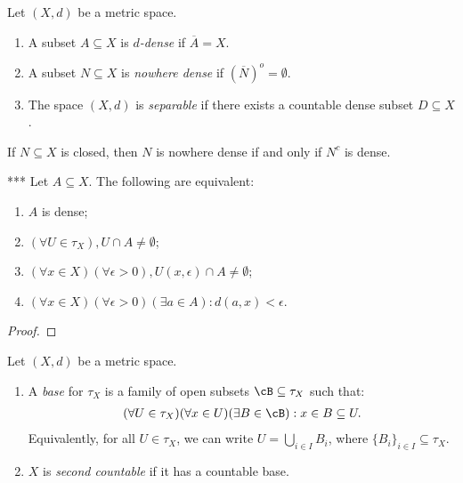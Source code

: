     \begin{definition}
        Let $(X,d)$ be a metric space.
        \begin{enumerate}[label = (\arabic*),itemsep=1pt,topsep=3pt]
            \item A subset $A \subseteq X$ is \textit{$d$-dense} if $\overline{A} = X$.
            \item A subset $N \subseteq X$ is \textit{nowhere dense} if $(\overline{N})^o = \emptyset$.
            \item The space $(X,d)$ is \textit{separable} if there exists a countable dense subset $D \subseteq X$.
        \end{enumerate}
    \end{definition}

    \begin{exercise}
        If $N \subseteq X$ is closed, then $N$ is nowhere dense if and only if $N^c$ is dense.
    \end{exercise}

    \begin{proposition}\label{prop:dense-properties}***
        Let $A \subseteq X$. The following are equivalent:
            \begin{enumerate}[label = (\arabic*),itemsep=1pt,topsep=3pt]
                \item $A$ is dense;
                \item $(\forall U \in \tau_X),U \cap A \neq \emptyset$;
                \item $(\forall x \in X)(\forall \epsilon>0), U(x,\epsilon) \cap A \neq \emptyset$;
                \item $(\forall x \in X)(\forall \epsilon>0)(\exists a \in A):d(a,x) < \epsilon$.
            \end{enumerate}
    \end{proposition}
        \begin{proof}
            
        \end{proof}

    \begin{definition}
        Let $(X,d)$ be a metric space. 
        \begin{enumerate}[label = (\arabic*),itemsep=1pt,topsep=3pt]
            \item A \textit{base} for $\tau_X$ is a family of open subsets $\cB \subseteq \tau_X$ such that:
                \begin{equation*}
                \begin{split}
                    (\forall U \in \tau_X)(\forall x\in U)(\exists B \in \cB):x \in B \subseteq U.
                \end{split}
                \end{equation*}
            Equivalently, for all $U \in \tau_X$, we can write $U = \bigcup_{i \in I}B_i$, where $\{B_i\}_{i \in I} \subseteq \tau_X$.

            \item $X$ is \textit{second countable} if it has a countable base.
        \end{enumerate}
    \end{definition}

